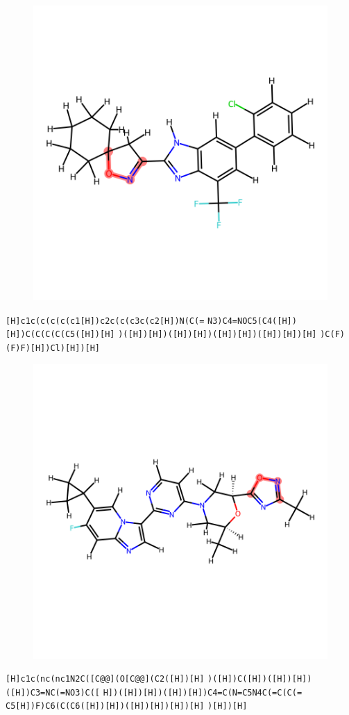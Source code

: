 \documentclass{article}
\begin{document}
\begin{figure}[ht]
\centering
    \includegraphics{mol156.png}
\end{figure}
\verb|[H]c1c(c(c(c(c1[H])c2c(c(c3c(c2[H])N(C(=| \verb|N3)C4=NOC5(C4([H])[H])C(C(C(C(C5([H])[H]| \verb|)([H])[H])([H])[H])([H])[H])([H])[H])[H]| \verb|)C(F)(F)F)[H])Cl)[H])[H]|

\begin{figure}[ht]
\centering
    \includegraphics{mol157.png}
\end{figure}
\verb|[H]c1c(nc(nc1N2C([C@@](O[C@@](C2([H])[H]| \verb|)([H])C([H])([H])[H])([H])C3=NC(=NO3)C([| \verb|H])([H])[H])([H])[H])C4=C(N=C5N4C(=C(C(=| \verb|C5[H])F)C6(C(C6([H])[H])([H])[H])[H])[H]| \verb|)[H])[H]|
\end{document}
